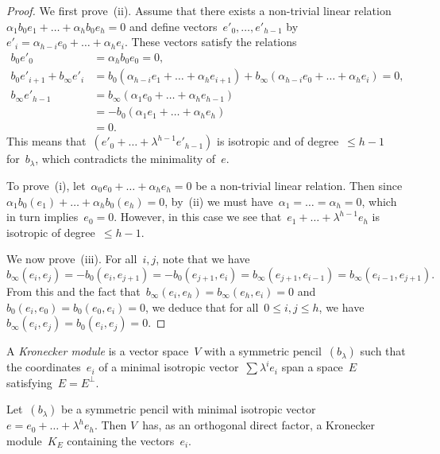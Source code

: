 \documentclass{article}%
\begin{document}
\begin{proof}
We first prove~(ii). Assume that there exists a non-trivial linear
relation~$α_1 b_0 e_1 + … + α_h b_0 e_{h} = 0$ and define
vectors~$e'_0,…,e'_{h-1}$ by $e'_i = α_{h-i} e_0 + … + α_{h} e_i$. These
vectors satisfy the relations
\begin{equation}\label{eq:relation-e'}
\begin{split}
b_0 e'_0 &= α_h b_0 e_0 = 0, \\
b_0 e'_{i+1} + b_{∞} e'_i
  &= b_0 (α_{h-i} e_1 + … + α_h e_{i+1})
  + b_{∞} (α_{h-i} e_0 + … + α_h e_i) = 0, \\
b_{∞} e'_{h-1} &= b_{∞} (α_1 e_{0} + … + α_{h} e_{h-1}) \\
 &= -b_{0} (α_1 e_{1} + … + α_{h} e_{h}) \\
 &= 0.
\end{split}
\end{equation}
This means that~$(e'_0+…+λ^{h-1} e'_{h-1})$ is isotropic and of degree~$≤
h-1$ for~$b_{λ}$, which contradicts the minimality of~$e$.

To prove~(i), let~$α_0 e_0 + … + α_h e_h = 0$ be a non-trivial linear
relation. Then since $α_1 b_0(e_1) + … + α_h b_0(e_h) = 0$, by~(ii) we
must have~$α_1 = … = α_h = 0$, which in turn implies~$e_0 = 0$. However,
in this case we see that~$e_1+…+ λ^{h-1} e_h$ is isotropic of degree~$≤
h-1$.

We now prove~(iii). For all~$i, j$, note that we have
\begin{equation}\label{eq:zero-bij}
b_{∞}(e_i,e_j) = -b_0(e_i, e_{j+1}) = -b_0(e_{j+1}, e_i) =
  b_{∞} (e_{j+1}, e_{i-1}) = b_{∞} (e_{i-1}, e_{j+1}).
\end{equation}
From this and the fact that~$b_{∞} (e_i, e_h) = b_{∞} (e_h, e_i) = 0$
and~$b_0 (e_i, e_0) = b_0 (e_0, e_i) = 0$, we deduce that for all~$0 ≤
i,j ≤ h$, we have~$b_{∞} (e_i, e_j) = b_0 (e_i, e_j) = 0$.
\end{proof}

A \emph{Kronecker module} is a vector space~$V$ with a symmetric
pencil~$(b_{λ})$ such that the coordinates~$e_i$ of a minimal isotropic
vector~$∑ λ^i e_i$ span a space~$E$ satisfying~$E = E^{⟂}$.

\begin{prop}\label{prop:kronecker-split}%
Let~$(b_{λ})$ be a symmetric pencil with minimal isotropic vector~$e =
e_0 + … + λ^h e_h$. Then $V$~has, as an orthogonal direct factor,
a Kronecker module~$K_E$ containing the vectors~$e_i$.
\end{prop}
\end{document}
